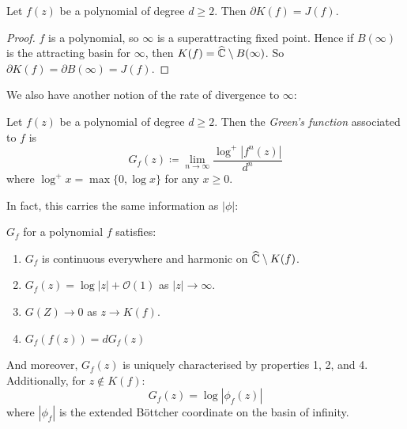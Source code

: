 \documentclass[10pt,a4paper]{article}
\begin{document}
\begin{corollary}
  Let $f(z)$ be a polynomial of degree $d \geq 2$. Then $\partial K(f) = J(f)$.
\end{corollary}
\begin{proof}
  $f$ is a polynomial, so $\infty$ is a superattracting fixed point. Hence if $B(\infty)$ is the attracting basin for $\infty$, then $K(f) = \widehat{\mathbb{C}}\setminus B(\infty)$. So $\partial K(f) = \partial B(\infty) = J(f)$.
\end{proof}
We also have another notion of the rate of divergence to $\infty$:
\begin{definition}
  Let $f(z)$ be a polynomial of degree $d \geq 2$. Then the \emph{Green's function} associated to $f$ is
  \[ G_f(z) \coloneqq \lim_{n\to\infty} \frac{\log^+|f^n(z)|}{d^n}\]
  where $\log^+ x = \max\{0, \log x\}$ for any $x \geq 0$.
\end{definition}
In fact, this carries the same information as $|\phi|$:
\begin{lemma}
  $G_f$ for a polynomial $f$ satisfies:
  \begin{enumerate}
    \item $G_f$ is continuous everywhere and harmonic on $\widehat{\mathbb{C}}\setminus K(f)$.
    \item $G_f(z) = \log|z| + \mathcal{O}(1)$ as $|z|\to \infty$.
    \item $G(Z) \to 0$ as $z\to K(f)$.
    \item $G_f(f(z)) = dG_f(z)$
  \end{enumerate}
  And moreover, $G_f(z)$ is uniquely characterised by properties 1, 2, and 4. Additionally, for $z \notin K(f)$:
  \[G_f(z) = \log |\phi_f(z)|\]
  where $|\phi_f|$ is the extended B\"ottcher coordinate on the basin of infinity.
\end{lemma}
\end{document}
